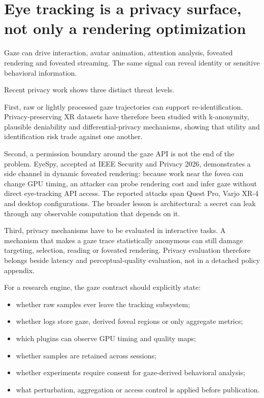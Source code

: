 \section{Eye tracking is a privacy surface, not only a rendering optimization}\label{04-visual-computing-ii-ch035-eye-tracking-is-a-privacy-surface-not-only-a-rendering-optimization}

Gaze can drive interaction, avatar animation, attention analysis, foveated rendering and foveated streaming. The same signal can reveal identity or sensitive behavioral information.

Recent privacy work shows three distinct threat levels.

First, raw or lightly processed gaze trajectories can support re-identification. Privacy-preserving XR datasets have therefore been studied with k-anonymity, plausible deniability and differential-privacy mechanisms, showing that utility and identification risk trade against one another.

Second, a permission boundary around the gaze API is not the end of the problem. EyeSpy, accepted at IEEE Security and Privacy 2026, demonstrates a side channel in dynamic foveated rendering: because work near the fovea can change GPU timing, an attacker can probe rendering cost and infer gaze without direct eye-tracking API access. The reported attacks span Quest Pro, Varjo XR-4 and desktop configurations. The broader lesson is architectural: a secret can leak through any observable computation that depends on it.

Third, privacy mechanisms have to be evaluated in interactive tasks. A mechanism that makes a gaze trace statistically anonymous can still damage targeting, selection, reading or foveated rendering. Privacy evaluation therefore belongs beside latency and perceptual-quality evaluation, not in a detached policy appendix.

For a research engine, the gaze contract should explicitly state:

\begin{itemize}
\tightlist
\item
  whether raw samples ever leave the tracking subsystem;
\item
  whether logs store gaze, derived foveal regions or only aggregate metrics;
\item
  which plugins can observe GPU timing and quality maps;
\item
  whether samples are retained across sessions;
\item
  whether experiments require consent for gaze-derived behavioral analysis;
\item
  what perturbation, aggregation or access control is applied before publication.
\end{itemize}

